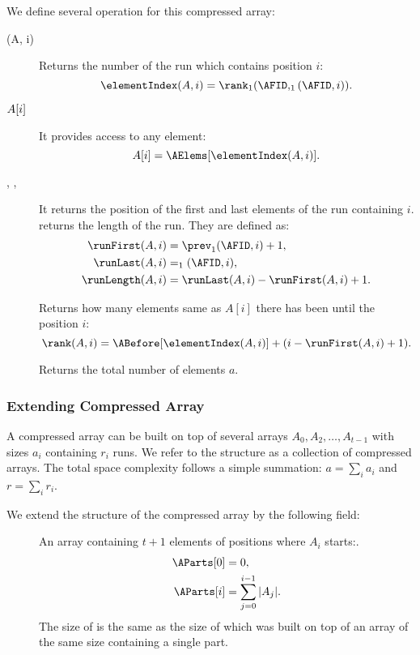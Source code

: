 We define several operation for this compressed array:
\begin{description}
	\item[\elementIndex(A, i)]
	Returns the number of the run which contains position $i$:
	$$ \elementIndex(A, i) = \rank_1(\AFID, \succ_1(\AFID, i)). $$

	\item[$A[i\char93$]
	It provides access to any element:
	$$ A[i] = \AElems[\elementIndex(A, i)]. $$

	\item[\runFirst{}, \runLast{}, \runLength{}]
	It returns the position of the first and last elements of the run containing $i$.
	\runLength{} returns the length of the run.
	They are defined as:
	\begin{align*}
		\runFirst(A, i) &= \prev_1(\AFID, i) + 1, \\
		\runLast(A, i) &= \succ_1(\AFID, i), \\
		\runLength(A, i) &= \runLast(A, i) - \runFirst(A, i) + 1.
	\end{align*}
	
	\item[\rank{}]
	Returns how many elements same as $A[i]$ there has been until the position $i$:
	$$ \rank(A, i) = \ABefore[\elementIndex(A, i)] + (i - \runFirst(A, i) + 1). $$
	
	\item[\size{}]
	Returns the total number of elements $a$.
\end{description}

\subsubsection{Extending Compressed Array}

A compressed array can be built on top of several arrays $A_0, A_2, \ldots, A_{t-1}$ with sizes $a_i$ containing $r_i$ runs.
We refer to the structure as a collection of compressed arrays.
The total space complexity follows a simple summation: $a = \sum_i a_i$ and $r = \sum_i r_i$.

We extend the structure of the compressed array by the following field:
\begin{description}
	\item[\AParts{}]
	An array containing $t + 1$ elements of positions where $A_i$ starts:.
	\begin{align*}
		\AParts[0] &= 0, \\
		\AParts[i] &= \sum_{j = 0}^{i - 1} |A_{j}|.
	\end{align*}
	The size of \AParts{} is the same as the size of \ABefore{} which was built on top of an array of the same size containing a single part.
\end{description}

